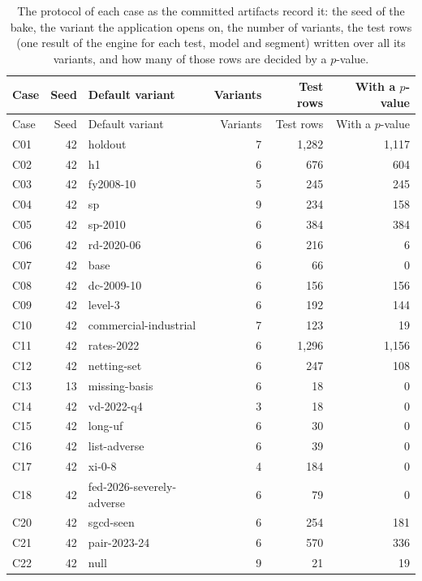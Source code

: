 {\footnotesize
\setlength{\tabcolsep}{3pt}
\renewcommand{\arraystretch}{1.12}
\begin{longtable}{lrlrrr}
\caption{The protocol of each case as the committed artifacts record it: the seed of the bake, the variant the application opens on, the number of variants, the test rows (one result of the engine for each test, model and segment) written over all its variants, and how many of those rows are decided by a $p$-value.}\label{tab:protocol-cases}\\
\toprule
Case & Seed & Default variant & Variants & Test rows & With a $p$-value \\
\midrule
\endfirsthead
\toprule
Case & Seed & Default variant & Variants & Test rows & With a $p$-value \\
\midrule
\endhead
\bottomrule
\endfoot
C01 & 42 & holdout & 7 & 1{,}282 & 1{,}117 \\
C02 & 42 & h1 & 6 & 676 & 604 \\
C03 & 42 & fy2008-10 & 5 & 245 & 245 \\
C04 & 42 & sp & 9 & 234 & 158 \\
C05 & 42 & sp-2010 & 6 & 384 & 384 \\
C06 & 42 & rd-2020-06 & 6 & 216 & 6 \\
C07 & 42 & base & 6 & 66 & 0 \\
C08 & 42 & dc-2009-10 & 6 & 156 & 156 \\
C09 & 42 & level-3 & 6 & 192 & 144 \\
C10 & 42 & commercial-industrial & 7 & 123 & 19 \\
C11 & 42 & rates-2022 & 6 & 1{,}296 & 1{,}156 \\
C12 & 42 & netting-set & 6 & 247 & 108 \\
C13 & 13 & missing-basis & 6 & 18 & 0 \\
C14 & 42 & vd-2022-q4 & 3 & 18 & 0 \\
C15 & 42 & long-uf & 6 & 30 & 0 \\
C16 & 42 & list-adverse & 6 & 39 & 0 \\
C17 & 42 & xi-0-8 & 4 & 184 & 0 \\
C18 & 42 & fed-2026-severely-adverse & 6 & 79 & 0 \\
C20 & 42 & sgcd-seen & 6 & 254 & 181 \\
C21 & 42 & pair-2023-24 & 6 & 570 & 336 \\
C22 & 42 & null & 9 & 21 & 19 \\
\end{longtable}
}

